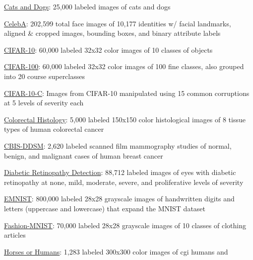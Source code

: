 \documentclass{tufte-handout}
\begin{document}
\bi
\item
  \href{https://github.com/tensorflow/datasets/blob/master/docs/datasets.md\#cats_vs_dogs}{Cats
  and Dogs}: 25,000 labeled images of cats and dogs
\item
  \href{https://github.com/tensorflow/datasets/blob/master/docs/datasets.md\#celeb_a}{CelebA}:
  202,599 total face images of 10,177 identities w/ facial landmarks,
  aligned \& cropped images, bounding boxes, and binary attribute labels
\item
  \href{https://github.com/tensorflow/datasets/blob/master/docs/datasets.md\#cifar10}{CIFAR-10}:
  60,000 labeled 32x32 color images of 10 classes of objects
\item
  \href{https://github.com/tensorflow/datasets/blob/master/docs/datasets.md\#cifar100}{CIFAR-100}:
  60,000 labeled 32x32 color images of 100 fine classes, also grouped
  into 20 course superclasses
\item
  \href{https://github.com/tensorflow/datasets/blob/master/docs/datasets.md\#cifar10_corrupted}{CIFAR-10-C}:
  Images from CIFAR-10 manipulated using 15 common corruptions at 5
  levels of severity each
\item
  \href{https://github.com/tensorflow/datasets/blob/master/docs/datasets.md\#colorectal_histology}{Colorectal
  Histology}: 5,000 labeled 150x150 color histological images of 8
  tissue types of human colorectal cancer
\item
  \href{https://github.com/tensorflow/datasets/blob/master/docs/datasets.md\#curated_breast_imaging_ddsm}{CBIS-DDSM}:
  2,620 labeled scanned film mammography studies of normal, benign, and
  malignant cases of human breast cancer
\item
  \href{https://github.com/tensorflow/datasets/blob/master/docs/datasets.md\#diabetic_retinopathy_detection}{Diabetic
  Retinopathy Detection}: 88,712 labeled images of eyes with diabetic
  retinopathy at none, mild, moderate, severe, and proliferative levels
  of severity
\item
  \href{https://github.com/tensorflow/datasets/blob/master/docs/datasets.md\#emnist}{EMNIST}:
  800,000 labeled 28x28 grayscale images of handwritten digits and
  letters (uppercase and lowercase) that expand the MNIST dataset
\item
  \href{https://github.com/tensorflow/datasets/blob/master/docs/datasets.md\#fashion_mnist}{Fashion-MNIST}:
  70,000 labeled 28x28 grayscale images of 10 classes of clothing
  articles
\item
  \href{https://github.com/tensorflow/datasets/blob/master/docs/datasets.md\#horses_or_humans}{Horses
  or Humans}: 1,283 labeled 300x300 color images of cgi humans and
\end{document}
